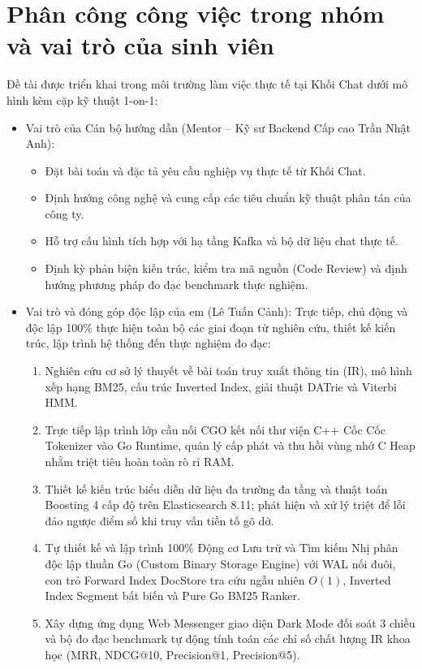 \documentclass[12pt,a4paper,oneside]{report}
\begin{document}
\section{Phân công công việc trong nhóm và vai trò của sinh viên}
Đề tài được triển khai trong môi trường làm việc thực tế tại Khối Chat dưới mô hình kèm cặp kỹ thuật 1-on-1:
\begin{itemize}
    \item Vai trò của Cán bộ hướng dẫn (Mentor -- Kỹ sư Backend Cấp cao Trần Nhật Anh):
    \begin{itemize}
        \item Đặt bài toán và đặc tả yêu cầu nghiệp vụ thực tế từ Khối Chat.
        \item Định hướng công nghệ và cung cấp các tiêu chuẩn kỹ thuật phân tán của công ty.
        \item Hỗ trợ cấu hình tích hợp với hạ tầng Kafka và bộ dữ liệu chat thực tế.
        \item Định kỳ phản biện kiến trúc, kiểm tra mã nguồn (Code Review) và định hướng phương pháp đo đạc benchmark thực nghiệm.
    \end{itemize}
    \item Vai trò và đóng góp độc lập của em (Lê Tuấn Cảnh): Trực tiếp, chủ động và độc lập 100\% thực hiện toàn bộ các giai đoạn từ nghiên cứu, thiết kế kiến trúc, lập trình hệ thống đến thực nghiệm đo đạc:
    \begin{enumerate}
        \item Nghiên cứu cơ sở lý thuyết về bài toán truy xuất thông tin (IR), mô hình xếp hạng BM25, cấu trúc Inverted Index, giải thuật DATrie và Viterbi HMM.
        \item Trực tiếp lập trình lớp cầu nối CGO \cite{ref6} kết nối thư viện C++ Cốc Cốc Tokenizer \cite{ref5} vào Go Runtime, quản lý cấp phát và thu hồi vùng nhớ C Heap nhằm triệt tiêu hoàn toàn rò rỉ RAM.
        \item Thiết kế kiến trúc biểu diễn dữ liệu đa trường đa tầng và thuật toán Boosting 4 cấp độ trên Elasticsearch 8.11; phát hiện và xử lý triệt để lỗi đảo ngược điểm số khi truy vấn tiền tố gõ dở.
        \item Tự thiết kế và lập trình 100\% Động cơ Lưu trữ và Tìm kiếm Nhị phân độc lập thuần Go (Custom Binary Storage Engine) với WAL nối đuôi, con trỏ Forward Index DocStore tra cứu ngẫu nhiên $O(1)$, Inverted Index Segment bất biến và Pure Go BM25 Ranker.
        \item Xây dựng ứng dụng Web Messenger giao diện Dark Mode đối soát 3 chiều và bộ đo đạc benchmark tự động tính toán các chỉ số chất lượng IR khoa học (MRR, NDCG@10, Precision@1, Precision@5).
    \end{enumerate}
\end{itemize}
\end{document}
